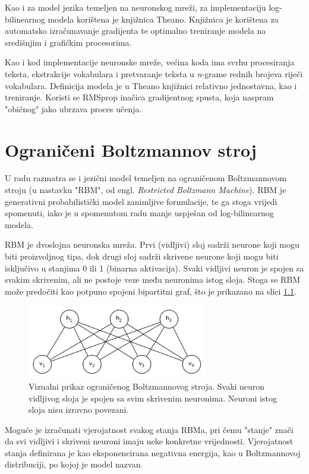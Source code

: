 \documentclass[times, utf8, diplomski, numeric]{fer}
\begin{document}
Kao i za model jezika temeljen na neuronskog mreži, za implementaciju log-bilinearnog modela korištena je knjižnica Theano. Knjižnica je korištena za automatsko izračunavanje gradijenta te optimalno treniranje modela na središnjim i grafičkim procesorima.

Kao i kod implementacije neuronske mreže, većina koda ima svrhu procesiranja teksta, ekstrakcije vokabulara i pretvaranje teksta u \textit{n}-grame rednih brojeva riječi vokabulara. Definicija modela je u Theano knjižnici relativno jednostavna, kao i treniranje. Koristi se RMSprop inačica gradijentnog spusta, koja naspram "običnog" jako ubrzava proces učenja.

\chapter{Ograničeni Boltzmannov stroj}

U radu \cite{MnihH07} razmatra se i jezični model temeljen na ograničenom Boltzmannovom stroju (u nastavku "RBM", od engl. \textit{Restricted Boltzmann Machine}). RBM je generativni probabilistički model \cite{hinton_poe} zanimljive formulacije, te ga stoga vrijedi spomenuti, iako je u spomenutom radu manje uspješan od log-bilinearnog modela.

RBM je dvoslojna neuronska mreža. Prvi (vidljivi) sloj sadrži neurone koji mogu biti proizvoljnog tipa, dok drugi sloj sadrži skrivene neurone koji mogu biti isključivo u stanjima 0 ili 1 (binarna aktivacija). Svaki vidljivi neuron je spojen sa svakim skrivenim, ali ne postoje veze među neuronima istog sloja. Stoga se RBM može predočiti kao potpuno spojeni bipartitni graf, što je prikazano na slici \ref{fig:rbm}.

\begin{figure}[!htb]
\centering
\includegraphics[width=0.7\textwidth]{fig/rbm_ex1.pdf}
\caption{Vizualni prikaz ograničenog Boltzmannovog stroja. Svaki neuron vidljivog sloja je spojen sa svim skrivenim neuronima. Neuroni istog sloja nisu izravno povezani.}
\label{fig:rbm}
\end{figure}

Moguće je izračunati vjerojatnost svakog stanja RBMa, pri čemu "stanje" znači da svi vidljivi i skriveni neuroni imaju neke konkretne vrijednosti. Vjerojatnost stanja definirana je kao eksponencirana negativna energija, kao u Boltzmannovoj distribuciji, po kojoj je model nazvan.
\end{document}
